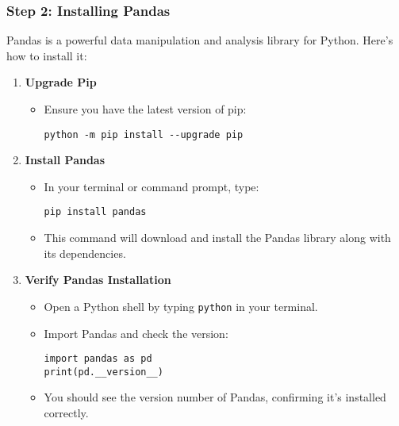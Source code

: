\documentclass[aspectratio=169]{beamer}
\begin{document}
\begin{frame}[fragile]
    \frametitle{Step 2: Installing Pandas}
    Pandas is a powerful data manipulation and analysis library for Python. Here’s how to install it:
    
    \begin{enumerate}
        \item \textbf{Upgrade Pip}
        \begin{itemize}
            \item Ensure you have the latest version of pip:
            \begin{lstlisting}
python -m pip install --upgrade pip
            \end{lstlisting}
        \end{itemize}

        \item \textbf{Install Pandas}
        \begin{itemize}
            \item In your terminal or command prompt, type:
            \begin{lstlisting}
pip install pandas
            \end{lstlisting}
            \item This command will download and install the Pandas library along with its dependencies.
        \end{itemize}

        \item \textbf{Verify Pandas Installation}
        \begin{itemize}
            \item Open a Python shell by typing \texttt{python} in your terminal.
            \item Import Pandas and check the version:
            \begin{lstlisting}
import pandas as pd
print(pd.__version__)
            \end{lstlisting}
            \item You should see the version number of Pandas, confirming it’s installed correctly.
        \end{itemize}
    \end{enumerate}
\end{frame}
\end{document}
